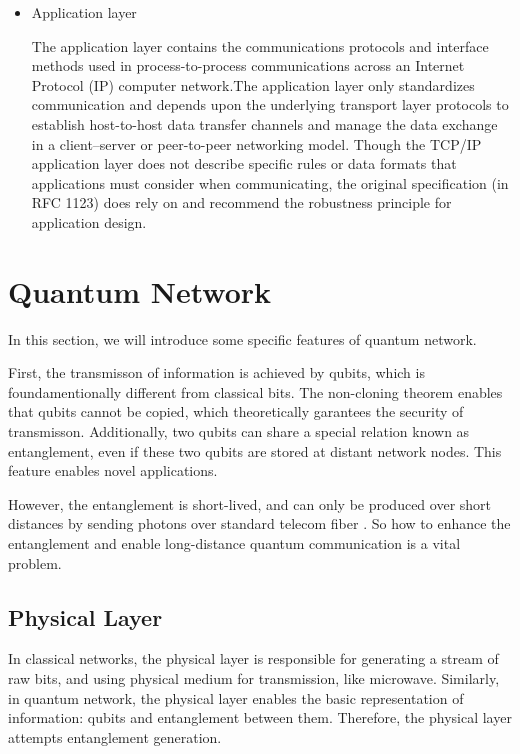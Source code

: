 \documentclass[10pt]{article}
\begin{document}
\begin{itemize}
    \item Application layer
    
    The application layer contains the communications protocols and interface methods used in process-to-process communications across an Internet Protocol (IP) computer network.The application layer only standardizes communication and depends upon the underlying transport layer protocols to establish host-to-host data transfer channels and manage the data exchange in a client–server or peer-to-peer networking model. Though the TCP/IP application layer does not describe specific rules or data formats that applications must consider when communicating, the original specification (in RFC 1123) does rely on and recommend the robustness principle for application design.

\end{itemize}

\section{Quantum Network}

In this section, we will introduce some specific features of quantum network.

First, the transmisson of information is achieved by qubits, which is foundamentionally different from classical bits. The non-cloning theorem enables that qubits cannot be copied, which theoretically garantees the security of transmisson. Additionally, two qubits can share a special relation known as entanglement, even if these two qubits are stored at distant network nodes. This feature enables novel applications. 

However, the entanglement is short-lived, and can only be produced over short distances by sending photons over standard telecom fiber \cite{dynes2009efficient}. So how to enhance the entanglement and enable long-distance quantum communication is a vital problem.

\subsection{Physical Layer}

In classical networks, the physical layer is responsible for generating a stream of raw bits, and using physical medium for transmission, like microwave. Similarly, in quantum network, the physical layer enables the basic representation of information: qubits and entanglement between them. Therefore, the physical layer attempts entanglement generation. 
\end{document}
